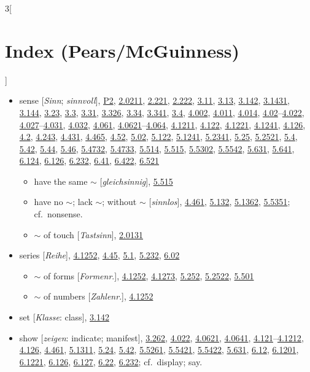 \documentclass[oneside,openany,12pt]{book}
\newcommand{\indexentry}[1]{\item #1}
\newcommand{\indexsubentry}[1]{\begin{itemize} \item #1 \end{itemize}}
\newcommand{\indexref}[1]{\hyperlink{prop#1}{#1}}
\begin{document}
\begin{multicols}{3}[\section*{Index (Pears/McGuinness)}]
\begin{itemize}
\indexentry{sense [\textit{Sinn}; \textit{sinnvoll}], \hyperlink{pref2}{P2}, \indexref{2.0211}, \indexref{2.221}, \indexref{2.222}, \indexref{3.11}, \indexref{3.13}, \indexref{3.142}, \indexref{3.1431}, \indexref{3.144}, \indexref{3.23}, \indexref{3.3}, \indexref{3.31}, \indexref{3.326}, \indexref{3.34}, \indexref{3.341}, \indexref{3.4}, \indexref{4.002}, \indexref{4.011}, \indexref{4.014}, \indexref{4.02}--\indexref{4.022}, \indexref{4.027}--\indexref{4.031}, \indexref{4.032}, \indexref{4.061}, \indexref{4.0621}--\indexref{4.064}, \indexref{4.1211}, \indexref{4.122}, \indexref{4.1221}, \indexref{4.1241}, \indexref{4.126}, \indexref{4.2}, \indexref{4.243}, \indexref{4.431}, \indexref{4.465}, \indexref{4.52}, \indexref{5.02}, \indexref{5.122}, \indexref{5.1241}, \indexref{5.2341}, \indexref{5.25}, \indexref{5.2521}, \indexref{5.4}, \indexref{5.42}, \indexref{5.44}, \indexref{5.46}, \indexref{5.4732}, \indexref{5.4733}, \indexref{5.514}, \indexref{5.515}, \indexref{5.5302}, \indexref{5.5542}, \indexref{5.631}, \indexref{5.641}, \indexref{6.124}, \indexref{6.126}, \indexref{6.232}, \indexref{6.41}, \indexref{6.422}, \indexref{6.521}}

   \indexsubentry{have the same $\sim$ [\textit{gleichsinnig}], \indexref{5.515}}

   \indexsubentry{have no $\sim$; lack $\sim$; without $\sim$ [\textit{sinnlos}], \indexref{4.461}, \indexref{5.132}, \indexref{5.1362}, \indexref{5.5351}; cf.\ nonsense.}

   \indexsubentry{$\sim$ of touch [\textit{Tastsinn}], \indexref{2.0131}}

\indexentry{series [\textit{Reihe}], \indexref{4.1252}, \indexref{4.45}, \indexref{5.1}, \indexref{5.232}, \indexref{6.02}}

   \indexsubentry{$\sim$ of forms [\textit{Formenr}.], \indexref{4.1252}, \indexref{4.1273}, \indexref{5.252}, \indexref{5.2522}, \indexref{5.501}}

   \indexsubentry{$\sim$ of numbers [\textit{Zahlenr}.], \indexref{4.1252}}

\indexentry{set [\textit{Klasse}: class], \indexref{3.142}}

\indexentry{show [\textit{zeigen}: indicate; manifest], \indexref{3.262}, \indexref{4.022}, \indexref{4.0621}, \indexref{4.0641}, \indexref{4.121}--\indexref{4.1212}, \indexref{4.126}, \indexref{4.461}, \indexref{5.1311}, \indexref{5.24}, \indexref{5.42}, \indexref{5.5261}, \indexref{5.5421}, \indexref{5.5422}, \indexref{5.631}, \indexref{6.12}, \indexref{6.1201}, \indexref{6.1221}, \indexref{6.126}, \indexref{6.127}, \indexref{6.22}, \indexref{6.232}; cf.\ display; say.}


\end{itemize}
\end{multicols}
\end{document}
